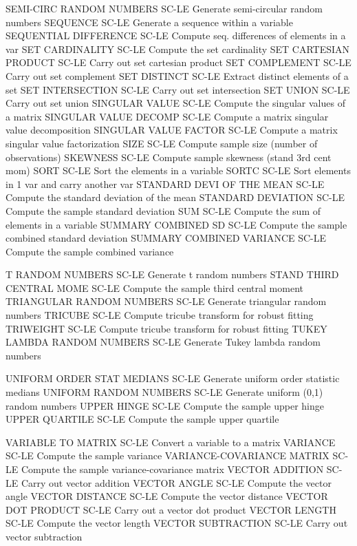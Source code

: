 SEMI-CIRC RANDOM NUMBERS    SC-LE Generate semi-circular random numbers
SEQUENCE                    SC-LE Generate a sequence within a variable
SEQUENTIAL DIFFERENCE       SC-LE Compute seq. differences of elements in a var
SET CARDINALITY             SC-LE Compute the set cardinality
SET CARTESIAN PRODUCT       SC-LE Carry out set cartesian product
SET COMPLEMENT              SC-LE Carry out set complement
SET DISTINCT                SC-LE Extract distinct elements of a set
SET INTERSECTION            SC-LE Carry out set intersection
SET UNION                   SC-LE Carry out set union
SINGULAR VALUE              SC-LE Compute the singular values of a matrix
SINGULAR VALUE DECOMP       SC-LE Compute a matrix singular value decomposition
SINGULAR VALUE FACTOR       SC-LE Compute a matrix singular value factorization
SIZE                        SC-LE Compute sample size (number of observations)
SKEWNESS                    SC-LE Compute sample skewness (stand 3rd cent mom)
SORT                        SC-LE Sort the elements in a variable
SORTC                       SC-LE Sort elements in 1 var and carry another var
STANDARD DEVI OF THE MEAN   SC-LE Compute the standard deviation of the mean
STANDARD DEVIATION          SC-LE Compute the sample standard deviation
SUM                         SC-LE Compute the sum of elements in a variable
SUMMARY COMBINED SD         SC-LE Compute the sample combined standard deviation
SUMMARY COMBINED VARIANCE   SC-LE Compute the sample combined variance

T RANDOM NUMBERS            SC-LE Generate t random numbers
STAND THIRD CENTRAL MOME    SC-LE Compute the sample third central moment
TRIANGULAR RANDOM NUMBERS   SC-LE Generate triangular random numbers
TRICUBE                     SC-LE Compute tricube transform for robust fitting
TRIWEIGHT                   SC-LE Compute tricube transform for robust fitting
TUKEY LAMBDA RANDOM NUMBERS SC-LE Generate Tukey lambda random numbers

UNIFORM ORDER STAT MEDIANS  SC-LE Generate uniform order statistic medians
UNIFORM RANDOM NUMBERS      SC-LE Generate uniform (0,1) random numbers
UPPER HINGE                 SC-LE Compute the sample upper hinge
UPPER QUARTILE              SC-LE Compute the sample upper quartile

VARIABLE TO MATRIX          SC-LE Convert a variable to a matrix
VARIANCE                    SC-LE Compute the sample variance
VARIANCE-COVARIANCE MATRIX  SC-LE Compute the sample variance-covariance matrix
VECTOR ADDITION             SC-LE Carry out vector addition
VECTOR ANGLE                SC-LE Compute the vector angle
VECTOR DISTANCE             SC-LE Compute the vector distance
VECTOR DOT PRODUCT          SC-LE Carry out a vector dot product
VECTOR LENGTH               SC-LE Compute the vector length
VECTOR SUBTRACTION          SC-LE Carry out vector subtraction

